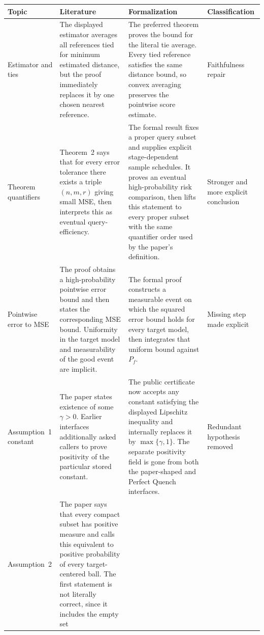 \documentclass[11pt]{article}
\begin{document}
\begin{longtable}{>{\raggedright\arraybackslash}p{}
                  >{\raggedright\arraybackslash}p{}
                  >{\raggedright\arraybackslash}p{}
                  >{\raggedright\arraybackslash}p{}}
\toprule
Topic & Literature & Formalization & Classification \\
\midrule
\endhead
Estimator and ties & The displayed estimator averages all references tied for
minimum estimated distance, but the proof immediately replaces it by one
chosen nearest reference. & The preferred theorem proves the bound for the
literal tie average.  Every tied reference satisfies the same distance bound,
so convex averaging preserves the pointwise score estimate. & Faithfulness
repair \\
\addlinespace
Theorem quantifiers & Theorem~2 says that for every error tolerance there exists
a triple $(n,m,r)$ giving small MSE, then interprets this as eventual
query-efficiency. & The formal result fixes a proper query subset and supplies
explicit stage-dependent sample schedules.  It proves an eventual
high-probability risk comparison, then lifts this statement to every proper
subset with the same quantifier order used by the paper's definition. &
Stronger and more explicit conclusion \\
\addlinespace
Pointwise error to MSE & The proof obtains a high-probability pointwise error
bound and then states the corresponding MSE bound.  Uniformity in the target
model and measurability of the good event are implicit. & The formal proof
constructs a measurable event on which the squared error bound holds for every
target model, then integrates that uniform bound against $P_f$. & Missing step
made explicit \\
\addlinespace
Assumption~1 constant & The paper states existence of some $\gamma>0$.  Earlier
interfaces additionally asked callers to prove positivity of the particular
stored constant. & The public certificate now accepts any constant satisfying
the displayed Lipschitz inequality and internally replaces it by
$\max\{\gamma,1\}$.  The separate positivity field is gone from both the
paper-shaped and Perfect Quench interfaces. & Redundant hypothesis removed \\
\addlinespace
Assumption~2 & The paper says that every compact subset has positive measure and
calls this equivalent to positive probability of every target-centered ball.
The first statement is not literally correct, since it includes the empty set

\end{longtable}
\end{document}
